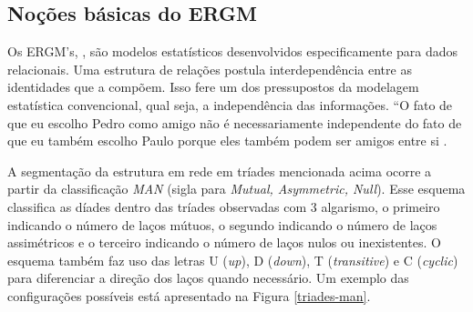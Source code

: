 \documentclass[a4paper, 12pt, openright, oneside, german, french, english, brazil]{abntex2}
\begin{document}
	
	
	\subsection{Noções básicas do ERGM}
	
	Os ERGM's, \cite{robins2007introduction,lusher2013exponential,lazega2014redes,brailly2017explorer}, são modelos estatísticos desenvolvidos especificamente para dados relacionais. Uma estrutura de relações postula interdependência entre as identidades que a compõem. Isso fere um dos pressupostos da modelagem estatística convencional, qual seja, a independência das informações. ``O fato de que eu escolho Pedro como amigo não é necessariamente independente do fato de que eu também escolho Paulo porque eles também podem ser amigos entre si \cite[p. 76]{lazega2014redes}.
	
	
	A segmentação da estrutura em rede em tríades mencionada acima ocorre a partir da classificação \textit{MAN} (sigla para \textit{Mutual, Asymmetric, Null}). Esse esquema classifica as díades dentro das tríades observadas com 3 algarismo, o primeiro indicando o número de laços mútuos, o segundo indicando o número de laços assimétricos e o terceiro indicando o número de laços nulos ou inexistentes. O esquema também faz uso das letras U (\textit{up}), D (\textit{down}), T (\textit{transitive}) e C (\textit{cyclic}) para diferenciar a direção dos laços quando necessário. Um exemplo das configurações possíveis está apresentado na Figura \ref{triades-man}.
	
\end{document}
